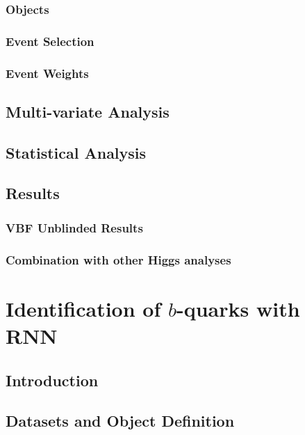 \documentclass{report}
\begin{document}
\subsection{Objects}

\subsection{Event Selection}

\subsection{Event Weights}

\clearpage

\section{Multi-variate Analysis}

\clearpage

\section{Statistical Analysis}

\clearpage

\section{Results}
\subsection{VBF \Hbb Unblinded Results}

\subsection{Combination with other Higgs analyses}
%

\clearpage


\chapter{Identification of $b$-quarks with RNN}
\label{chap:btagging}
\section{Introduction}


\section{Datasets and Object Definition}

\end{document}
